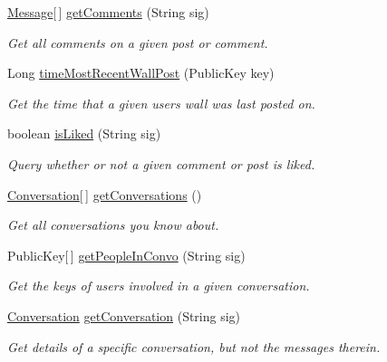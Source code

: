 \begin{DoxyCompactItemize}
\hyperlink{classballmerpeak_1_1turtlenet_1_1shared_1_1Message}{Message}\mbox{[}$\,$\mbox{]} \hyperlink{classballmerpeak_1_1turtlenet_1_1server_1_1Database_a4f77bc5e3bdf13f836136bc7eb763cac}{get\-Comments} (String sig)
\begin{DoxyCompactList}\small\item\em Get all comments on a given post or comment. \end{DoxyCompactList}\item 
Long \hyperlink{classballmerpeak_1_1turtlenet_1_1server_1_1Database_a4b2795d1417e265aa345d21e5e1c3a23}{time\-Most\-Recent\-Wall\-Post} (Public\-Key key)
\begin{DoxyCompactList}\small\item\em Get the time that a given users wall was last posted on. \end{DoxyCompactList}\item 
boolean \hyperlink{classballmerpeak_1_1turtlenet_1_1server_1_1Database_a76fdbae3c50e5e2fc64d9973de7e08d9}{is\-Liked} (String sig)
\begin{DoxyCompactList}\small\item\em Query whether or not a given comment or post is liked. \end{DoxyCompactList}\item 
\hyperlink{classballmerpeak_1_1turtlenet_1_1shared_1_1Conversation}{Conversation}\mbox{[}$\,$\mbox{]} \hyperlink{classballmerpeak_1_1turtlenet_1_1server_1_1Database_ab81803b4c6efc49a774faaba66add16d}{get\-Conversations} ()
\begin{DoxyCompactList}\small\item\em Get all conversations you know about. \end{DoxyCompactList}\item 
Public\-Key\mbox{[}$\,$\mbox{]} \hyperlink{classballmerpeak_1_1turtlenet_1_1server_1_1Database_ab4048f6c37cc47a31838aa992398cdac}{get\-People\-In\-Convo} (String sig)
\begin{DoxyCompactList}\small\item\em Get the keys of users involved in a given conversation. \end{DoxyCompactList}\item 
\hyperlink{classballmerpeak_1_1turtlenet_1_1shared_1_1Conversation}{Conversation} \hyperlink{classballmerpeak_1_1turtlenet_1_1server_1_1Database_a85b0c44b683cbbab3f966ce7b266f837}{get\-Conversation} (String sig)
\begin{DoxyCompactList}\small\item\em Get details of a specific conversation, but not the messages therein. \end{DoxyCompactList}\item 

\end{DoxyCompactItemize}

